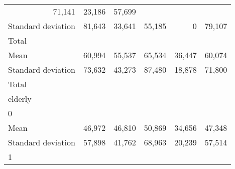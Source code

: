 \begin{tabular}{llllll}
  \multicolumn{1}{r}{71,141} &
  \multicolumn{1}{r}{23,186} &
  \multicolumn{1}{r}{57,699} \\
\multicolumn{1}{l}{\hspace{4em}Standard deviation} &
  \multicolumn{1}{|r}{81,643} &
  \multicolumn{1}{r}{33,641} &
  \multicolumn{1}{r}{55,185} &
  \multicolumn{1}{r}{0} &
  \multicolumn{1}{r}{79,107} \\
\multicolumn{1}{l}{\hspace{3em}Total} &
  \multicolumn{1}{|r}{} &
  \multicolumn{1}{r}{} &
  \multicolumn{1}{r}{} &
  \multicolumn{1}{r}{} &
  \multicolumn{1}{r}{} \\
\multicolumn{1}{l}{\hspace{4em}Mean} &
  \multicolumn{1}{|r}{60,994} &
  \multicolumn{1}{r}{55,537} &
  \multicolumn{1}{r}{65,534} &
  \multicolumn{1}{r}{36,447} &
  \multicolumn{1}{r}{60,074} \\
\multicolumn{1}{l}{\hspace{4em}Standard deviation} &
  \multicolumn{1}{|r}{73,632} &
  \multicolumn{1}{r}{43,273} &
  \multicolumn{1}{r}{87,480} &
  \multicolumn{1}{r}{18,878} &
  \multicolumn{1}{r}{71,800} \\
\multicolumn{1}{l}{\hspace{1em}Total} &
  \multicolumn{1}{|r}{} &
  \multicolumn{1}{r}{} &
  \multicolumn{1}{r}{} &
  \multicolumn{1}{r}{} &
  \multicolumn{1}{r}{} \\
\multicolumn{1}{l}{\hspace{2em}elderly} &
  \multicolumn{1}{|r}{} &
  \multicolumn{1}{r}{} &
  \multicolumn{1}{r}{} &
  \multicolumn{1}{r}{} &
  \multicolumn{1}{r}{} \\
\multicolumn{1}{l}{\hspace{3em}0} &
  \multicolumn{1}{|r}{} &
  \multicolumn{1}{r}{} &
  \multicolumn{1}{r}{} &
  \multicolumn{1}{r}{} &
  \multicolumn{1}{r}{} \\
\multicolumn{1}{l}{\hspace{4em}Mean} &
  \multicolumn{1}{|r}{46,972} &
  \multicolumn{1}{r}{46,810} &
  \multicolumn{1}{r}{50,869} &
  \multicolumn{1}{r}{34,656} &
  \multicolumn{1}{r}{47,348} \\
\multicolumn{1}{l}{\hspace{4em}Standard deviation} &
  \multicolumn{1}{|r}{57,898} &
  \multicolumn{1}{r}{41,762} &
  \multicolumn{1}{r}{68,963} &
  \multicolumn{1}{r}{20,239} &
  \multicolumn{1}{r}{57,514} \\
\multicolumn{1}{l}{\hspace{3em}1} &

\end{tabular}
